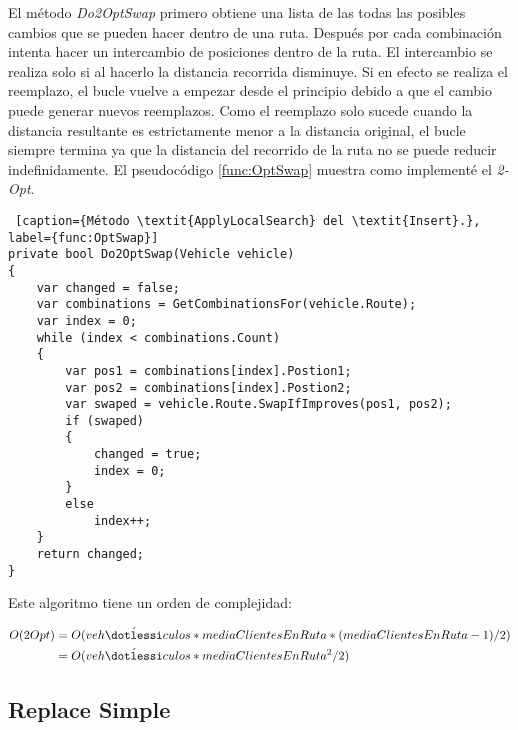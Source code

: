 \bigskip

El método \textit{Do2OptSwap} primero obtiene una lista de las todas las posibles cambios que se pueden hacer dentro de una ruta. Después por cada combinación intenta hacer un intercambio de posiciones dentro de la ruta. El intercambio se realiza solo si al hacerlo la distancia recorrida disminuye. Si en efecto se realiza el reemplazo, el bucle vuelve a empezar desde el principio debido a que el cambio puede generar nuevos reemplazos. Como el reemplazo solo sucede cuando la distancia resultante es estrictamente menor a la distancia original, el bucle siempre termina ya que la distancia del recorrido de la ruta no se puede reducir indefinidamente. El pseudocódigo \ref{func:OptSwap} muestra como implementé el \textit{2-Opt}.

\bigskip

\begin{minipage}{\textwidth}
\begin{lstlisting} [caption={Método \textit{ApplyLocalSearch} del \textit{Insert}.}, label={func:OptSwap}]
private bool Do2OptSwap(Vehicle vehicle)
{
	var changed = false;	
	var combinations = GetCombinationsFor(vehicle.Route);
	var index = 0;
	while (index < combinations.Count)
	{
		var pos1 = combinations[index].Postion1;
		var pos2 = combinations[index].Postion2;
		var swaped = vehicle.Route.SwapIfImproves(pos1, pos2);
		if (swaped)
		{
			changed = true;
			index = 0;
		}
		else
			index++;
	}
	return changed;
}
\end{lstlisting}
\end{minipage}


\begin{minipage}{\linewidth}
Este algoritmo tiene un orden de complejidad:

\begin{equation*}
\begin{split}
O(2Opt) &= O(veh\acute{\dotlessi}culos * mediaClientesEnRuta  * (mediaClientesEnRuta - 1) / 2) \\
            &= O(veh\acute{\dotlessi}culos * mediaClientesEnRuta^2 / 2)
\end{split}
\end{equation*}
\end{minipage}

\bigskip

\subsection{Replace Simple}


